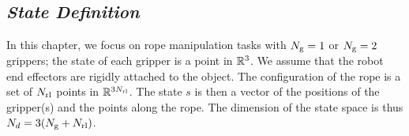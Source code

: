 \subsection{\textit{State Definition}}

In this chapter, we focus on rope manipulation tasks with $N_\text{g}=1$ or $N_\text{g}=2$ grippers; the state of each gripper is a point in $\mathbb{R}^3$. We assume that the robot end effectors are rigidly attached to the object. The configuration of the rope is a set of $N_\text{rl}$ points in $\mathbb{R}^{3N_\text{rl}}$. The state $s$ is then a vector of the positions of the gripper(s) and the points along the rope. The dimension of the state space is thus $N_d = 3 (N_\text{g} + N_\text{rl} )$.
